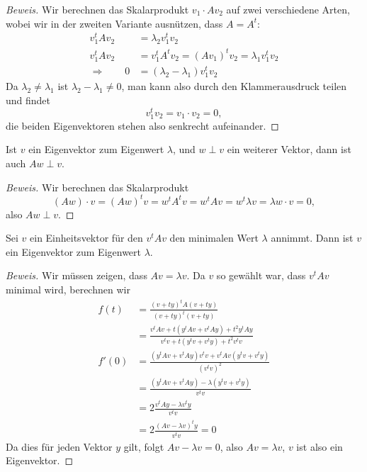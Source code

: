 \begin{proof}[Beweis]
Wir berechnen das Skalarprodukt $v_1\cdot Av_2$ auf zwei verschiedene
Arten, wobei wir in der zweiten Variante ausnützen, dass $A=A^t$:
\begin{align*}
v_1^tAv_2&=\lambda_2v_1^tv_2
\\
v_1^tAv_2&=v_1^tA^tv_2=(Av_1)^tv_2=\lambda_1v_1^tv_2
\\
\Rightarrow
\qquad
0&=(\lambda_2-\lambda_1)v_1^tv_2
\end{align*}
Da $\lambda_2\ne\lambda_1$ ist $\lambda_2-\lambda_1\ne 0$, man kann
also durch den Klammerausdruck teilen und findet
\[
v_1^tv_2=v_1\cdot v_2=0,
\]
die beiden Eigenvektoren stehen also senkrecht aufeinander.
\end{proof}

\begin{hilfssatz}
\label{ev-ortho}
Ist $v$ ein Eigenvektor zum Eigenwert $\lambda$, und $w\perp v$ ein weiterer
Vektor, dann ist auch $Aw\perp v$.
\end{hilfssatz}

\begin{proof}[Beweis]
Wir berechnen das Skalarprodukt
\[
(Aw)\cdot v=(Aw)^t v=w^tA^tv=w^tAv=w^t\lambda v=\lambda w\cdot v=0,
\]
also $Aw\perp v$.
\end{proof}

\begin{hilfssatz}
\label{ev-existenz}
Sei $v$ ein Einheitsvektor für den $v^tAv$ den minimalen Wert $\lambda$ annimmt.
Dann ist $v$ ein Eigenvektor zum Eigenwert $\lambda$.
\end{hilfssatz}

\begin{proof}[Beweis]
Wir müssen zeigen, dass $Av=\lambda v$.
Da $v$ so gewählt war, dass $v^tAv$ minimal wird, berechnen wir 
\begin{align*}
f(t)&=\frac{(v+ty)^tA(v+ty)}{(v+ty)^t(v+ty)}
\\
&=
\frac{v^tAv+t(y^tAv+v^tAy)+t^2y^tAy}{v^tv+t(y^tv+v^ty)+t^2v^tv}
\\
f'(0)
&=
\frac{ (y^tAv+v^tAy)v^tv + v^tAv(y^tv+v^ty) }{ (v^tv)^2 }
\\
&=
\frac{ (y^tAv+v^tAy) - \lambda (y^tv+v^ty) }{ v^tv }
\\
&=
2\frac{ v^tAy - \lambda v^ty }{ v^tv }
\\
&=
2\frac{ (Av - \lambda v)^ty }{ v^tv }=0
\end{align*}
Da dies für jeden Vektor $y$ gilt, folgt $Av-\lambda v=0$, also
$Av=\lambda v$, $v$ ist also ein Eigenvektor.
\end{proof}

